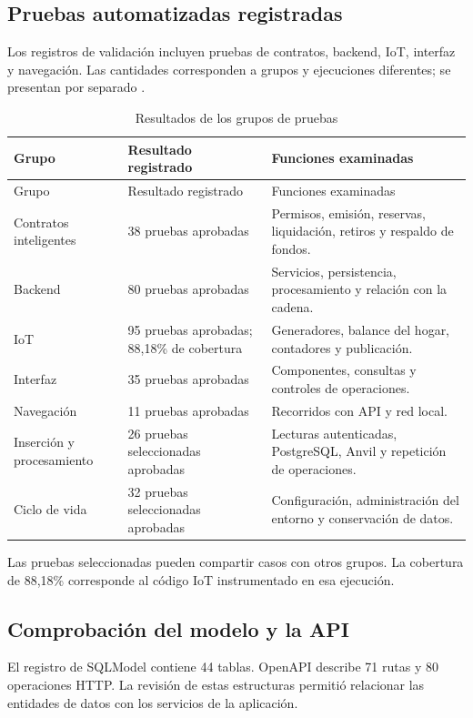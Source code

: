 \subsection{Pruebas automatizadas registradas}
Los registros de validación incluyen pruebas de contratos, backend, IoT, interfaz y navegación. Las cantidades corresponden a grupos y ejecuciones diferentes; se presentan por separado \citep{verification,development}.

\begin{longtable}{L{.27\linewidth}L{.22\linewidth}L{.41\linewidth}}
\caption{Resultados de los grupos de pruebas}\label{tab:pruebas}\\
\toprule Grupo & Resultado registrado & Funciones examinadas \\ \midrule\endfirsthead
\toprule Grupo & Resultado registrado & Funciones examinadas \\ \midrule\endhead
Contratos inteligentes & 38 pruebas aprobadas & Permisos, emisión, reservas, liquidación, retiros y respaldo de fondos.\\
Backend & 80 pruebas aprobadas & Servicios, persistencia, procesamiento y relación con la cadena.\\
IoT & 95 pruebas aprobadas; 88,18\% de cobertura & Generadores, balance del hogar, contadores y publicación.\\
Interfaz & 35 pruebas aprobadas & Componentes, consultas y controles de operaciones.\\
Navegación & 11 pruebas aprobadas & Recorridos con API y red local.\\
Inserción y procesamiento & 26 pruebas seleccionadas aprobadas & Lecturas autenticadas, PostgreSQL, Anvil y repetición de operaciones.\\
Ciclo de vida & 32 pruebas seleccionadas aprobadas & Configuración, administración del entorno y conservación de datos.\\
\bottomrule
\end{longtable}
Las pruebas seleccionadas pueden compartir casos con otros grupos. La cobertura de 88,18\% corresponde al código IoT instrumentado en esa ejecución.

\subsection{Comprobación del modelo y la API}
El registro de SQLModel contiene 44 tablas. OpenAPI describe 71 rutas y 80 operaciones HTTP. La revisión de estas estructuras permitió relacionar las entidades de datos con los servicios de la aplicación.

